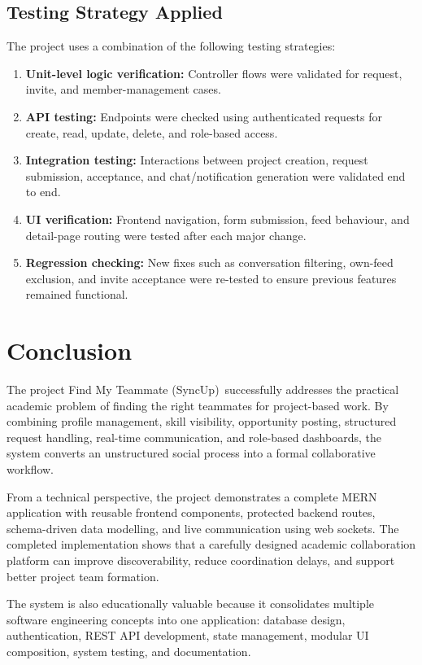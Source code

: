 \documentclass[12pt,a4paper,oneside]{report}
\newcommand{\projecttitle}{Find My Teammate (SyncUp)}
\begin{document}
\section{Testing Strategy Applied}
The project uses a combination of the following testing strategies:
\begin{enumerate}[label=\arabic*.]
  \item \textbf{Unit-level logic verification:} Controller flows were validated for request, invite, and member-management cases.
  \item \textbf{API testing:} Endpoints were checked using authenticated requests for create, read, update, delete, and role-based access.
  \item \textbf{Integration testing:} Interactions between project creation, request submission, acceptance, and chat/notification generation were validated end to end.
  \item \textbf{UI verification:} Frontend navigation, form submission, feed behaviour, and detail-page routing were tested after each major change.
  \item \textbf{Regression checking:} New fixes such as conversation filtering, own-feed exclusion, and invite acceptance were re-tested to ensure previous features remained functional.
\end{enumerate}

\chapter{Conclusion}
The project \projecttitle\ successfully addresses the practical academic problem of finding the right teammates for project-based work. By combining profile management, skill visibility, opportunity posting, structured request handling, real-time communication, and role-based dashboards, the system converts an unstructured social process into a formal collaborative workflow.

From a technical perspective, the project demonstrates a complete MERN application with reusable frontend components, protected backend routes, schema-driven data modelling, and live communication using web sockets. The completed implementation shows that a carefully designed academic collaboration platform can improve discoverability, reduce coordination delays, and support better project team formation.

The system is also educationally valuable because it consolidates multiple software engineering concepts into one application: database design, authentication, REST API development, state management, modular UI composition, system testing, and documentation.
\end{document}
